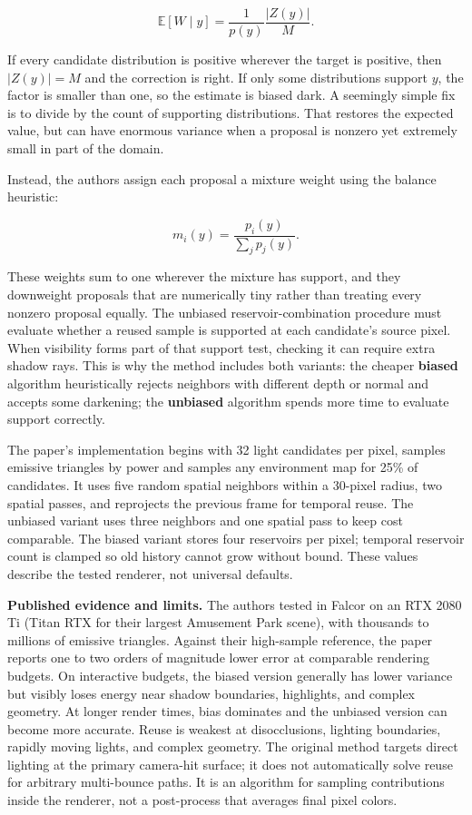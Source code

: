 \[\mathbb{E}[W\mid y]=\frac{1}{p(y)}\frac{|Z(y)|}{M}.\]

If every candidate distribution is positive wherever the target is positive, then \(|Z(y)|=M\) and the correction is right. If only some distributions support \(y\), the factor is smaller than one, so the estimate is biased dark. A seemingly simple fix is to divide by the count of supporting distributions. That restores the expected value, but can have enormous variance when a proposal is nonzero yet extremely small in part of the domain.

Instead, the authors assign each proposal a mixture weight using the balance heuristic:

\[m_i(y)=\frac{p_i(y)}{\sum_j p_j(y)}.\]

These weights sum to one wherever the mixture has support, and they downweight proposals that are numerically tiny rather than treating every nonzero proposal equally. The unbiased reservoir-combination procedure must evaluate whether a reused sample is supported at each candidate's source pixel. When visibility forms part of that support test, checking it can require extra shadow rays. This is why the method includes both variants: the cheaper \textbf{biased} algorithm heuristically rejects neighbors with different depth or normal and accepts some darkening; the \textbf{unbiased} algorithm spends more time to evaluate support correctly.

The paper's implementation begins with 32 light candidates per pixel, samples emissive triangles by power and samples any environment map for 25\% of candidates. It uses five random spatial neighbors within a 30-pixel radius, two spatial passes, and reprojects the previous frame for temporal reuse. The unbiased variant uses three neighbors and one spatial pass to keep cost comparable. The biased variant stores four reservoirs per pixel; temporal reservoir count is clamped so old history cannot grow without bound. These values describe the tested renderer, not universal defaults.

\textbf{Published evidence and limits.} The authors tested in Falcor on an RTX 2080 Ti (Titan RTX for their largest Amusement Park scene), with thousands to millions of emissive triangles. Against their high-sample reference, the paper reports one to two orders of magnitude lower error at comparable rendering budgets. On interactive budgets, the biased version generally has lower variance but visibly loses energy near shadow boundaries, highlights, and complex geometry. At longer render times, bias dominates and the unbiased version can become more accurate. Reuse is weakest at disocclusions, lighting boundaries, rapidly moving lights, and complex geometry. The original method targets direct lighting at the primary camera-hit surface; it does not automatically solve reuse for arbitrary multi-bounce paths. It is an algorithm for sampling contributions inside the renderer, not a post-process that averages final pixel colors.

